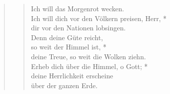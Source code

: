 \begin{quote}
\begin{verse}
Ich will das Morgenrot wecken.\\ 
\vin Ich will dich vor den Völkern preisen, Herr, *\\ 
\vin dir vor den Nationen lobsingen.\\ 
Denn deine Güte reicht,\\
so weit der Himmel ist, *\\
deine Treue, so weit die Wolken ziehn.\\ 
\vin Erheb dich über die Himmel, o Gott; *\\ 
\vin deine Herrlichkeit erscheine\\ 
\vin über der ganzen Erde.\\

\end{verse}
\end{quote}


\vspace{0.6cm}

\def\greinitialformat#1{{\fontsize{40}{40}\selectfont #1}}
\gresetfirstlineaboveinitial{\small \textcolor{red}{Tob 13}}{}
\setaboveinitialseparation{0.72mm}



